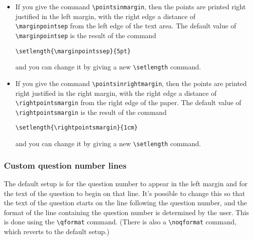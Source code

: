 \documentclass[12pt]{exam}
\begin{document}
\begin{itemize}
\item If you give the command \verb"\pointsinmargin", then the points
  are printed right justified in the left margin, with the right edge
  a distance of \verb"\marginpointsep" from the left edge of the text
  area.  The default value of \verb"\marginpointsep" is the result of
  the command
  \begin{center}
    \verb"\setlength{\marginpointssep}{5pt}"
  \end{center}
  and you can change it by giving a new \verb"\setlength" command.
  
\item If you give the command \verb"\pointsinrightmargin", then the
  points are printed right justified in the right margin, with the
  right edge a distance of \verb"\rightpointsmargin" from the right
  edge of the paper.  The default value of \verb"\rightpointsmargin"
  is the result of the command
  \begin{center}
    \verb"\setlength{\rightpointsmargin}{1cm}"
  \end{center}
  and you can change it by giving a new \verb"\setlength" command.
\end{itemize}



\subsubsection{Custom question number lines}
\label{sec:qformat}

The default setup is for the question number to appear in the left
margin and for the text of the question to begin on that line.  It's
possible to change this so that the text of the question starts on the
line following the question number, and the format of the line
containing the question number is determined by the user.  This is
done using the \verb"\qformat" command.  (There is also a
\verb"\noqformat" command, which reverts to the default setup.)
\end{document}
